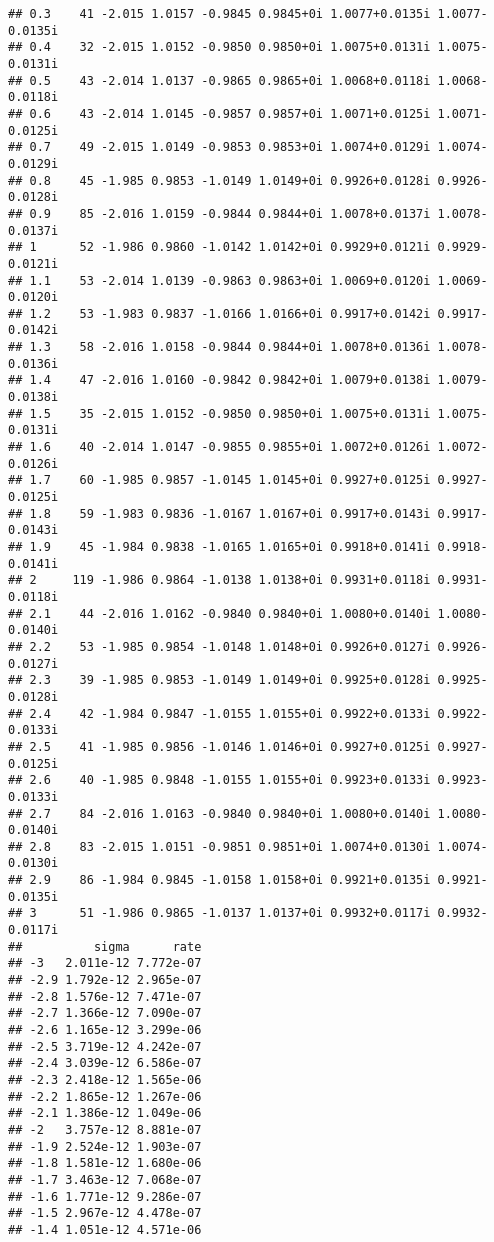 \documentclass[
  12pt,
]{article}
\begin{document}
\begin{verbatim}
## 0.3    41 -2.015 1.0157 -0.9845 0.9845+0i 1.0077+0.0135i 1.0077-0.0135i
## 0.4    32 -2.015 1.0152 -0.9850 0.9850+0i 1.0075+0.0131i 1.0075-0.0131i
## 0.5    43 -2.014 1.0137 -0.9865 0.9865+0i 1.0068+0.0118i 1.0068-0.0118i
## 0.6    43 -2.014 1.0145 -0.9857 0.9857+0i 1.0071+0.0125i 1.0071-0.0125i
## 0.7    49 -2.015 1.0149 -0.9853 0.9853+0i 1.0074+0.0129i 1.0074-0.0129i
## 0.8    45 -1.985 0.9853 -1.0149 1.0149+0i 0.9926+0.0128i 0.9926-0.0128i
## 0.9    85 -2.016 1.0159 -0.9844 0.9844+0i 1.0078+0.0137i 1.0078-0.0137i
## 1      52 -1.986 0.9860 -1.0142 1.0142+0i 0.9929+0.0121i 0.9929-0.0121i
## 1.1    53 -2.014 1.0139 -0.9863 0.9863+0i 1.0069+0.0120i 1.0069-0.0120i
## 1.2    53 -1.983 0.9837 -1.0166 1.0166+0i 0.9917+0.0142i 0.9917-0.0142i
## 1.3    58 -2.016 1.0158 -0.9844 0.9844+0i 1.0078+0.0136i 1.0078-0.0136i
## 1.4    47 -2.016 1.0160 -0.9842 0.9842+0i 1.0079+0.0138i 1.0079-0.0138i
## 1.5    35 -2.015 1.0152 -0.9850 0.9850+0i 1.0075+0.0131i 1.0075-0.0131i
## 1.6    40 -2.014 1.0147 -0.9855 0.9855+0i 1.0072+0.0126i 1.0072-0.0126i
## 1.7    60 -1.985 0.9857 -1.0145 1.0145+0i 0.9927+0.0125i 0.9927-0.0125i
## 1.8    59 -1.983 0.9836 -1.0167 1.0167+0i 0.9917+0.0143i 0.9917-0.0143i
## 1.9    45 -1.984 0.9838 -1.0165 1.0165+0i 0.9918+0.0141i 0.9918-0.0141i
## 2     119 -1.986 0.9864 -1.0138 1.0138+0i 0.9931+0.0118i 0.9931-0.0118i
## 2.1    44 -2.016 1.0162 -0.9840 0.9840+0i 1.0080+0.0140i 1.0080-0.0140i
## 2.2    53 -1.985 0.9854 -1.0148 1.0148+0i 0.9926+0.0127i 0.9926-0.0127i
## 2.3    39 -1.985 0.9853 -1.0149 1.0149+0i 0.9925+0.0128i 0.9925-0.0128i
## 2.4    42 -1.984 0.9847 -1.0155 1.0155+0i 0.9922+0.0133i 0.9922-0.0133i
## 2.5    41 -1.985 0.9856 -1.0146 1.0146+0i 0.9927+0.0125i 0.9927-0.0125i
## 2.6    40 -1.985 0.9848 -1.0155 1.0155+0i 0.9923+0.0133i 0.9923-0.0133i
## 2.7    84 -2.016 1.0163 -0.9840 0.9840+0i 1.0080+0.0140i 1.0080-0.0140i
## 2.8    83 -2.015 1.0151 -0.9851 0.9851+0i 1.0074+0.0130i 1.0074-0.0130i
## 2.9    86 -1.984 0.9845 -1.0158 1.0158+0i 0.9921+0.0135i 0.9921-0.0135i
## 3      51 -1.986 0.9865 -1.0137 1.0137+0i 0.9932+0.0117i 0.9932-0.0117i
##          sigma      rate
## -3   2.011e-12 7.772e-07
## -2.9 1.792e-12 2.965e-07
## -2.8 1.576e-12 7.471e-07
## -2.7 1.366e-12 7.090e-07
## -2.6 1.165e-12 3.299e-06
## -2.5 3.719e-12 4.242e-07
## -2.4 3.039e-12 6.586e-07
## -2.3 2.418e-12 1.565e-06
## -2.2 1.865e-12 1.267e-06
## -2.1 1.386e-12 1.049e-06
## -2   3.757e-12 8.881e-07
## -1.9 2.524e-12 1.903e-07
## -1.8 1.581e-12 1.680e-06
## -1.7 3.463e-12 7.068e-07
## -1.6 1.771e-12 9.286e-07
## -1.5 2.967e-12 4.478e-07
## -1.4 1.051e-12 4.571e-06

\end{verbatim}
\end{document}
